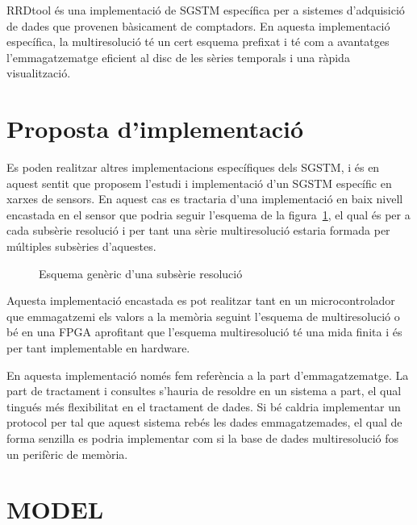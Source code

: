 RRDtool és una implementació de SGSTM específica per a sistemes
d'adquisició de dades que provenen bàsicament de comptadors. En
aquesta implementació específica, la multiresolució té un cert esquema
prefixat i té com a avantatges l'emmagatzematge eficient al disc de les
sèries temporals i una ràpida visualització.


\section{Proposta d'implementació}

Es poden realitzar altres implementacions específiques dels SGSTM, i
és en aquest sentit que proposem l'estudi i implementació d'un SGSTM
específic en xarxes de sensors. En aquest cas es tractaria d'una
implementació en baix nivell encastada en el sensor que podria seguir
l'esquema de la figura~\ref{fig:vhdl:resolucio}, el qual és per a cada
subsèrie resolució i per tant una sèrie multiresolució estaria formada
per múltiples subsèries d'aquestes.


\begin{figure}[htp]
\centering

\caption{Esquema genèric d'una subsèrie resolució}
\label{fig:vhdl:resolucio}
\end{figure}

Aquesta implementació encastada es pot realitzar tant en un
microcontrolador que emmagatzemi els valors a la memòria seguint
l'esquema de multiresolució o bé en una FPGA aprofitant que l'esquema
multiresolució té una mida finita i és per tant implementable en
hardware. 

En aquesta implementació només fem referència a la part
d'emmagatzematge. La part de tractament i consultes s'hauria de
resoldre en un sistema a part, el qual tingués més flexibilitat en el
tractament de dades. Si bé caldria implementar un protocol per tal que
aquest sistema rebés les dades emmagatzemades, el qual de forma
senzilla es podria implementar com si la base de dades multiresolució
fos un perifèric de memòria.









\section{MODEL}








